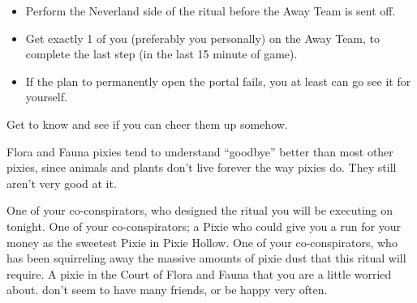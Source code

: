 \documentclass[char]{PP}
\begin{document}
\begin{itemz}
	\item 
	\begin{itemize}
		\item Perform the Neverland side of the ritual before the Away Team is sent off.
		\item Get exactly 1 of you (preferably you personally) on the Away Team, to complete the last step (in the last 15 minute of game).
		\item If the plan to permanently open the portal fails, you at least can go see it for yourself.
	\end{itemize}
	\item Get to know \cFWanabe{} and see if you can cheer them up somehow.
\end{itemz}

\begin{itemz}[Notes]
	\item Flora and Fauna pixies tend to understand ``goodbye'' better than most other pixies, since animals and plants don’t live forever the way pixies do. They still aren't very good at it.
\end{itemz}

\begin{contacts}
	\contact{\cSLibrarian{}} One of your co-conspirators, who designed the ritual you will be executing on tonight.
	\contact{\cESweet{}} One of your co-conspirators; a Pixie who could give you a run for your money as the sweetest Pixie in Pixie Hollow.
	\contact{\cMIron{}} One of your co-conspirators, who has been squirreling away the massive amounts of pixie dust that this ritual will require.
	\contact{\cFWanabe{}} A pixie in the Court of Flora and Fauna that you are a little worried about. \cFWanabe{\They} don’t seem to have many friends, or be happy very often.
\end{contacts}
\end{document}
